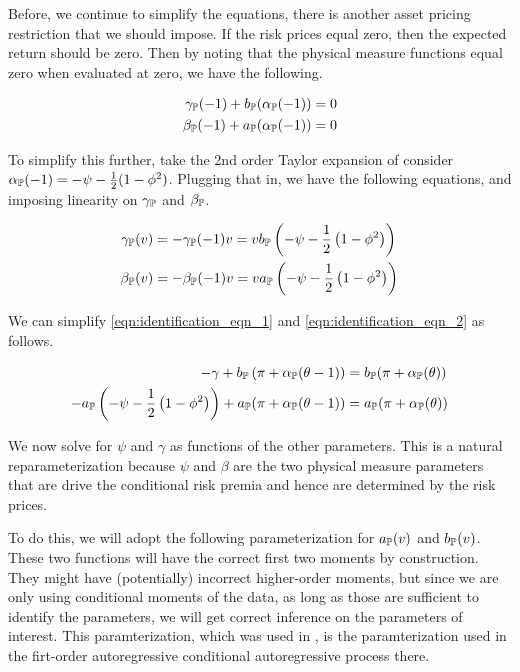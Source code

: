 \documentclass[11pt, letterpaper, twoside, final]{article}
\begin{document}
Before, we continue to simplify the equations, there is another asset pricing restriction that we should impose.
If the risk prices equal zero, then the expected return should be zero.
Then by noting that the physical measure functions equal zero when evaluated at zero, we have the following.

\begin{align}
    \gamma_{\mathbb{P}}(-1) + b_{\mathbb{P}}(\alpha_{\mathbb{P}}(-1))  = 0  \\
    \beta_{\mathbb{P}}(-1) + a_{\mathbb{P}}(\alpha_{\mathbb{P}}(-1))  =  0
\end{align}

To simplify this further, take the 2nd order Taylor expansion of consider $\alpha_{\mathbb{P}}(-1) = -\psi -
\frac{1}{2}(1 - \phi^2)$. 
Plugging that in, we have the following equations, and imposing linearity on $\gamma_{\mathbb{P}}$ and $\beta_{\mathbb{P}}$.

\begin{align}
    \gamma_{\mathbb{P}}(v) &= - \gamma_{\mathbb{P}}(-1) v = v b_{\mathbb{P}}\left(-\psi - \frac{1}{2}\left(1 - \phi^2\right)\right)
    \\
    \beta_{\mathbb{P}}(v) &= - \beta_{\mathbb{P}}(-1) v = v a_{\mathbb{P}}\left(-\psi - \frac{1}{2}\left(1 - \phi^2\right)\right)
\end{align}

We can simplify \cref{eqn:identification_eqn_1} and \cref{eqn:identification_eqn_2} as follows.

\begin{align}
    -\gamma  + b_{\PP}\left(\pi + \alpha_{\PP}(\theta - 1)\right) &=  b_{\PP}(\pi + \alpha_{\PP}(\theta))  \\
%
    - a_{\PP}\left(-\psi - \frac{1}{2}\left(1 - \phi^2\right)\right)  + a_{\PP}(\pi + \alpha_{\PP}(\theta -1)) 
    &= a_{\PP}(\pi + \alpha_{\PP}(\theta)) 
\end{align}

We now solve for $\psi$ and $\gamma$ as functions of the other parameters.
This is a natural reparameterization because $\psi$ and $\beta$ are the two physical measure parameters that are
drive the conditional risk premia and hence are determined by the risk prices.

To do this, we will adopt the following parameterization for $a_{\mathbb{P}}(v)$  and $b_{\mathbb{P}}(v)$. 
These two functions will have the correct first two moments by construction.
They might have (potentially) incorrect higher-order moments, but since we are only using conditional moments of
the data, as long as those are sufficient to identify the parameters, we will get correct inference on the
parameters of interest. 
This paramterization, which was used in \textcite{krapov2017affine}, is the paramterization used in the
firt-order autoregressive conditional autoregressive process there.
\end{document}
